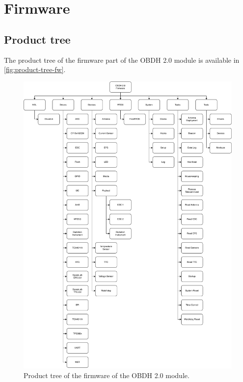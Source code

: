 %
%
%
%
%

%
%
%
%
%
%

\chapter{Firmware} \label{ch:firmware}

\section{Product tree}

The product tree of the firmware part of the OBDH 2.0 module is available in \autoref{fig:product-tree-fw}.

\begin{figure}[!ht]
    \begin{center}
        \includegraphics[width=\textwidth]{figures/product-tree-fw.pdf}
        \caption{Product tree of the firmware of the OBDH 2.0 module.}
        \label{fig:product-tree-fw}
    \end{center}
\end{figure}


